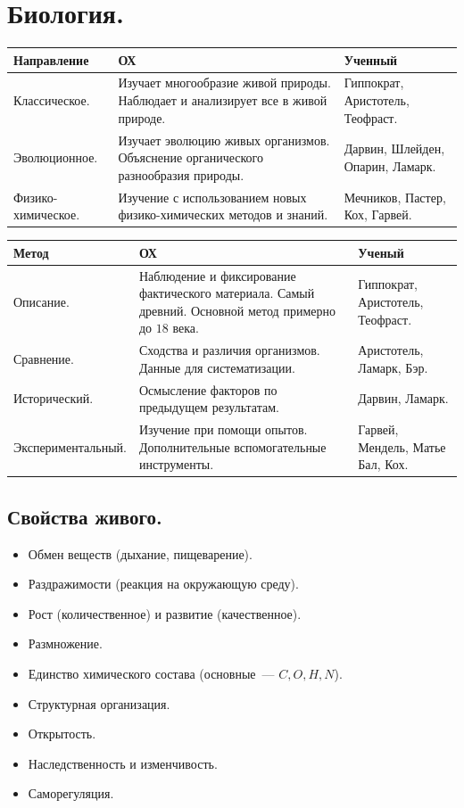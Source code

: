 \documentclass[12pt]{article}
\begin{document}
	\tableofcontents
	\setcounter{tocdepth}{3}
	\newpage
	\section{Биология.}
	\begin{xltabular}{\textwidth}{|p{3cm}|X|p{3cm}|}
		\hline
		Направление & ОХ & Ученный \\
		\hline
		Классическое. & Изучает многообразие живой природы. Наблюдает и анализирует все в живой природе. & Гиппократ, Аристотель, Теофраст. \\
		\hline
		Эволюционное. & Изучает эволюцию живых организмов. Объяснение органического разнообразия природы. & Дарвин, Шлейден, Опарин, Ламарк. \\
		\hline
		Физико-химическое. & Изучение с использованием новых физико-химических методов и знаний. & Мечников, Пастер, Кох, Гарвей. \\
		\hline
	\end{xltabular}
	\begin{xltabular}{\textwidth}{|p{3.8cm}|X|p{3cm}|}
		\hline
		Метод & ОХ & Ученый \\
		\hline
		Описание. & Наблюдение и фиксирование фактического материала. Самый древний. Основной метод примерно до $18$ века. & Гиппократ, Аристотель, Теофраст. \\
		\hline
		Сравнение. & Сходства и различия организмов. Данные для систематизации. & Аристотель, Ламарк, Бэр. \\
		\hline
		Исторический. & Осмысление факторов по предыдущем результатам. & Дарвин, Ламарк. \\
		\hline
		Экспериментальный. & Изучение при помощи опытов. Дополнительные вспомогательные инструменты. & Гарвей, Мендель, Матье Бал, Кох. \\
		\hline
	\end{xltabular}
	\subsection{Свойства живого.}
	\begin{itemize}
		\item Обмен веществ (дыхание, пищеварение).
		\item Раздражимости (реакция на окружающую среду).
		\item Рост (количественное) и развитие (качественное).
		\item Размножение.
		\item Единство химического состава (основные~--- $C, O, H, N$).
		\item Структурная организация.
		\item Открытость.
		\item Наследственность и изменчивость.
		\item Саморегуляция.
	\end{itemize}
\end{document}
